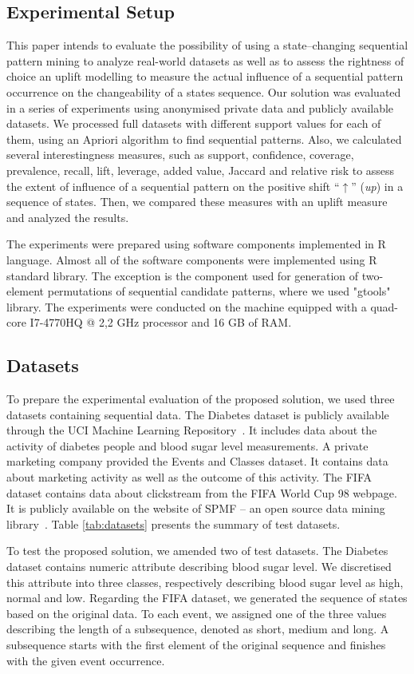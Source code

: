 \documentclass[runningheads,a4paper]{llncs}
\begin{document}
\subsection{Experimental Setup}
This paper intends to evaluate the possibility of using a state--changing sequential pattern mining to analyze real-world datasets as well as to assess the rightness of choice an uplift modelling to measure the actual influence of a sequential pattern occurrence on the changeability of a states sequence. Our solution was evaluated in a series of experiments using anonymised private data and publicly available datasets. We processed full datasets with different support values for each of them, using an Apriori algorithm to find sequential patterns. Also, we calculated several interestingness measures, such as support, confidence, coverage, prevalence, recall, lift, leverage, added value, Jaccard and relative risk to assess the extent of influence of a sequential pattern on the positive shift ``$\uparrow$'' (\textit{up}) in a sequence of states. Then, we compared these measures with an uplift measure and analyzed the results. 

The experiments were prepared using software components implemented in R language. Almost all of the software components were implemented using R standard library. The exception is the component used for generation of two-element permutations of sequential candidate patterns, where we used "gtools" library. The experiments were conducted on the machine equipped with a quad-core I7-4770HQ @ 2,2 GHz processor and 16 GB of RAM.

\subsection{Datasets}
To prepare the experimental evaluation of the proposed solution, we used three datasets containing sequential data. The Diabetes dataset is publicly available through the UCI Machine Learning Repository~\cite{Kahn:1994}. It includes data about the activity of diabetes people and blood sugar level measurements. A private marketing company provided the Events and Classes dataset. It contains data about marketing activity as well as the outcome of this activity. The FIFA dataset contains data about clickstream from the FIFA World Cup 98 webpage. It is publicly available on the website of SPMF – an open source data mining library~\cite{Fournier}. Table \ref{tab:datasets} presents the summary of test datasets.

To test the proposed solution, we amended two of test datasets. The Diabetes dataset contains numeric attribute describing blood sugar level. We discretised this attribute into three classes, respectively describing blood sugar level as high, normal and low. Regarding the FIFA dataset, we generated the sequence of states based on the original data. To each event, we assigned one of the three values describing the length of a subsequence, denoted as short, medium and long. A subsequence starts with the first element of the original sequence and finishes with the given event occurrence. 
\end{document}
